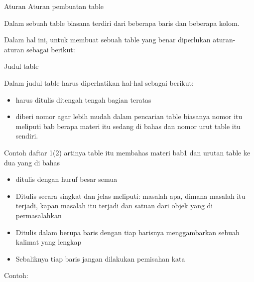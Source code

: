  Aturan Aturan pembuatan table\par

Dalam sebuah table biasana terdiri dari beberapa baris dan beberapa kolom.\par

Dalam hal ini, untuk membuat sebuah table yang benar diperlukan aturan-aturan sebagai berikut:\par



\noindent Judul table\par


\noindent Dalam judul table harus diperhatikan hal-hal sebagai berikut:\par

\begin{itemize}
	\item harus ditulis ditengah tengah bagian teratas\par

	\item diberi nomor agar lebih mudah dalam pencarian table biasanya nomor itu meliputi bab berapa materi itu sedang di bahas dan nomor urut table itu sendiri.
\end{itemize}\par


\noindent Contoh daftar 1(2) artinya table itu membahas materi bab1 dan urutan table ke dua yang di bahas\par

\begin{itemize}
	\item ditulis dengan huruf besar semua\par

	\item Ditulis secara singkat dan jelas meliputi: masalah apa, dimana masalah itu terjadi, kapan masalah itu terjadi dan satuan dari objek yang di permasalahkan\par

	\item Ditulis dalam berupa baris dengan tiap barisnya menggambarkan sebuah kalimat yang lengkap\par

	\item Sebaliknya tiap baris jangan dilakukan pemisahan kata
\end{itemize}\par


\noindent Contoh:\par


